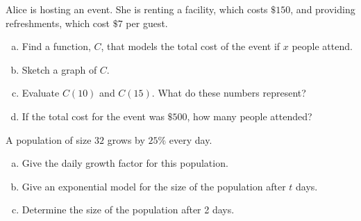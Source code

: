 \documentclass[12pt]{amsart}
\begin{document}
\begin{thm}[16 Points]\label{ex7}
  Alice is hosting an event.  She is renting a facility, which costs $\$150$, and providing refreshments, which cost $\$7$ per guest.
  \begin{enumerate}[(a)]
  \item
    Find a function, $C$, that models the total cost of the event if $x$ people attend.
    \vspace{1in}
  \item
    Sketch a graph of $C$.
    \vspace{2in}
  \item
    Evaluate $C(10)$ and $C(15)$.  What do these numbers represent?
    \vspace{1in}
  \item
    If the total cost for the event was $\$500$, how many people attended?
    \vspace{1in}
  \end{enumerate}
\end{thm}

\newpage

\begin{thm}[16 Points]
  A population of size $32$ grows by $25\%$ every day.
  \begin{enumerate}[(a)]
  \item
    Give the daily growth factor for this population.
    \vspace{1in}
  \item
    Give an exponential model for the size of the population after $t$ days.
    \vspace{1.5in}
  \item
    Determine the size of the population after 2 days.
    
    \vspace{1.5in}
  \end{enumerate}
\end{thm}


\end{document}
